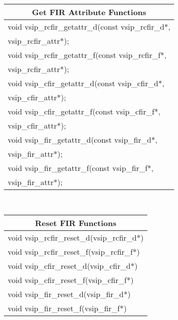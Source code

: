 \\
\hspace*{1.cm} {
\ttfamily
\begin{tabular}[H]{|l|}
\multicolumn{1}{c}{\rmfamily \bfseries Get FIR Attribute Functions\vspace{.1cm}}\\ \hline
void vsip\_rcfir\_getattr\_d(const vsip\_rcfir\_d*,\\*\hspace{.7cm}vsip\_rcfir\_attr*);\\
void vsip\_rcfir\_getattr\_f(const vsip\_rcfir\_f*,\\*\hspace{.7cm}vsip\_rcfir\_attr*);\\
void vsip\_cfir\_getattr\_d(const vsip\_cfir\_d*,\\*\hspace{.7cm}vsip\_cfir\_attr*);\\
void vsip\_cfir\_getattr\_f(const vsip\_cfir\_f*,\\*\hspace{.7cm}vsip\_cfir\_attr*);\\
void vsip\_fir\_getattr\_d(const vsip\_fir\_d*,\\*\hspace{.7cm}vsip\_fir\_attr*);\\
void vsip\_fir\_getattr\_f(const vsip\_fir\_f*,\\*\hspace{.7cm}vsip\_fir\_attr*);\\\hline
\end{tabular}\vspace{.1cm}
}\vspace{.1cm}
\\ \hspace*{1.cm} {
\ttfamily
\begin{tabular}[H]{|l|}
\multicolumn{1}{c}{\rmfamily \bfseries Reset FIR Functions\vspace{.1cm}}\\ \hline
void vsip\_rcfir\_reset\_d(vsip\_rcfir\_d*)\\
void vsip\_rcfir\_reset\_f(vsip\_rcfir\_f*)\\
void vsip\_cfir\_reset\_d(vsip\_cfir\_d*)\\
void vsip\_cfir\_reset\_f(vsip\_cfir\_f*)\\
void vsip\_fir\_reset\_d(vsip\_fir\_d*)\\
void vsip\_fir\_reset\_f(vsip\_fir\_f*)\\\hline
\end{tabular}\\
}
